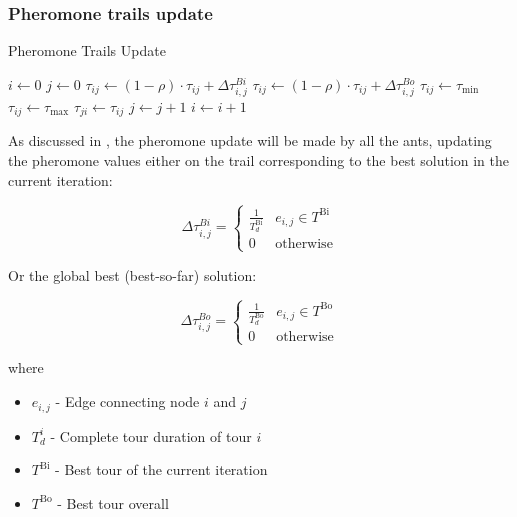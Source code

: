 \begin{homeworkProblem}
\subsubsection{Pheromone trails update}
\begin{algorithm}[!h]
  \caption{Pheromone Trails Update}\label{update}
  \begin{algorithmic}[1]
     \State $i \gets 0$
      \State $j \gets 0$
              \State $\tau_{ij} \gets (1-\rho)\cdot\tau_{ij}+\Delta\tau_{i,j}^{Bi}$
            \Else
              \State $\tau_{ij} \gets (1-\rho)\cdot\tau_{ij}+\Delta\tau_{i,j}^{Bo}$
            \EndIf
              \State $\tau_{ij} \gets \tau_{\min}$
            \EndIf
              \State $\tau_{ij} \gets \tau_{\max}$
            \EndIf
          \State $\tau_{ji} \gets \tau_{ij}$
          \State $ j \gets j + 1$  
        \EndFor
        \EndFor
        \State $ i \gets i + 1$ 
      \EndFor
    \EndProcedure
\end{algorithmic}
\end{algorithm}

As discussed in , the pheromone update will be made by all the ants, updating the pheromone values either on the trail corresponding to the best solution in the current iteration: 

\begin{equation}
  \Delta\tau_{i,j}^{Bi} = \begin{cases}
    \frac{1}{T_{d}^{\text{Bi}}} & e_{i,j} \in T^{\text{Bi}}  \\
    0 & \text{otherwise} 
      \end{cases}
\end{equation}

Or the global best (best-so-far) solution:

\begin{equation}
  \Delta\tau_{i,j}^{Bo} = \begin{cases}
    \frac{1}{T_{d}^{\text{Bo}}} & e_{i,j} \in T^{\text{Bo}}  \\
    0 & \text{otherwise} 
  \end{cases}
\end{equation}

where
\begin{itemize}
\item $e_{i,j}$ - Edge connecting node $i$ and $j$
\item $T_{d}^{i}$ - Complete tour duration of tour $i$
\item $T^{\text{Bi}}$ - Best tour of the current iteration
\item $T^{\text{Bo}}$ - Best tour overall 
\end{itemize}


\end{homeworkProblem}
